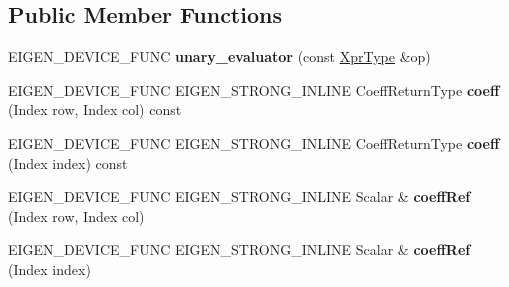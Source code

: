\subsection*{Public Member Functions}
\begin{DoxyCompactItemize}
\item 
\mbox{\label{struct_eigen_1_1internal_1_1unary__evaluator_3_01_cwise_unary_view_3_01_unary_op_00_01_arg_type_01_4_00_01_index_based_01_4_af633ab086ea6cc3cb88588c2376efe92}} 
E\+I\+G\+E\+N\+\_\+\+D\+E\+V\+I\+C\+E\+\_\+\+F\+U\+NC {\bfseries unary\+\_\+evaluator} (const \mbox{\hyperlink{class_eigen_1_1_cwise_unary_view}{Xpr\+Type}} \&op)
\item 
\mbox{\label{struct_eigen_1_1internal_1_1unary__evaluator_3_01_cwise_unary_view_3_01_unary_op_00_01_arg_type_01_4_00_01_index_based_01_4_a9edbb6c7f6ae15ad3e8cc4123632a531}} 
E\+I\+G\+E\+N\+\_\+\+D\+E\+V\+I\+C\+E\+\_\+\+F\+U\+NC E\+I\+G\+E\+N\+\_\+\+S\+T\+R\+O\+N\+G\+\_\+\+I\+N\+L\+I\+NE Coeff\+Return\+Type {\bfseries coeff} (Index row, Index col) const
\item 
\mbox{\label{struct_eigen_1_1internal_1_1unary__evaluator_3_01_cwise_unary_view_3_01_unary_op_00_01_arg_type_01_4_00_01_index_based_01_4_ad2afb3c371bb26f84ed5cd7fd878bbc5}} 
E\+I\+G\+E\+N\+\_\+\+D\+E\+V\+I\+C\+E\+\_\+\+F\+U\+NC E\+I\+G\+E\+N\+\_\+\+S\+T\+R\+O\+N\+G\+\_\+\+I\+N\+L\+I\+NE Coeff\+Return\+Type {\bfseries coeff} (Index index) const
\item 
\mbox{\label{struct_eigen_1_1internal_1_1unary__evaluator_3_01_cwise_unary_view_3_01_unary_op_00_01_arg_type_01_4_00_01_index_based_01_4_a9bd5e6e616769c6f7b28fe118601e85b}} 
E\+I\+G\+E\+N\+\_\+\+D\+E\+V\+I\+C\+E\+\_\+\+F\+U\+NC E\+I\+G\+E\+N\+\_\+\+S\+T\+R\+O\+N\+G\+\_\+\+I\+N\+L\+I\+NE Scalar \& {\bfseries coeff\+Ref} (Index row, Index col)
\item 
\mbox{\label{struct_eigen_1_1internal_1_1unary__evaluator_3_01_cwise_unary_view_3_01_unary_op_00_01_arg_type_01_4_00_01_index_based_01_4_aad6e4b9dce0bbb631e0c4f01e0347c8d}} 
E\+I\+G\+E\+N\+\_\+\+D\+E\+V\+I\+C\+E\+\_\+\+F\+U\+NC E\+I\+G\+E\+N\+\_\+\+S\+T\+R\+O\+N\+G\+\_\+\+I\+N\+L\+I\+NE Scalar \& {\bfseries coeff\+Ref} (Index index)
\end{DoxyCompactItemize}
